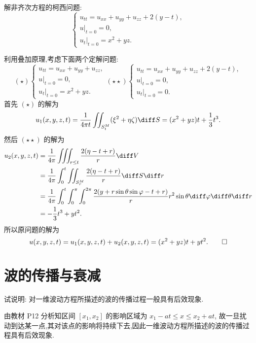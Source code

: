 \begin{exercise}[8]
  解非齐次方程的柯西问题:
  \[\begin{cases}
    u_{tt} = u_{xx}+u_{yy}+u_{zz}+2(y-t), \\
    u|_{t=0} = 0, \\
    u_t|_{t=0} = x^2+yz.
  \end{cases}\]
\end{exercise}

\begin{solve}
  利用叠加原理,考虑下面两个定解问题:
  \[(\star)
  \begin{cases}
    u_{tt}=u_{xx}+u_{yy}+u_{zz}, \\
    u|_{t=0}=0, \\
    u_t|_{t=0}=x^2+yz.
  \end{cases}
  (\star\star)
  \begin{cases}
    u_{tt} = u_{xx}+u_{yy}+u_{zz}+2(y-t), \\
    u|_{t=0}=0, \\
    u_t|_{t=0}=0.
  \end{cases}\]
  首先 $(\star)$ 的解为
  \[u_1(x,y,z,t) = \frac{1}{4\pi t}\iint_{S_t^M}(\xi^2+\eta\zeta)\diff S
    = (x^2+yz)t+\frac{1}{3}t^3.\]
  然后 $(\star\star)$ 的解为
  \[\begin{split}
    u_2(x,y,z,t)
    & = \frac{1}{4\pi}\iiint_{r\leq t}\frac{2(\eta-t+r)}{r}\diff V \\
    & = \frac{1}{4\pi}\int_0^t\iint_{S_r^M}\frac{2(\eta-t+r)}{r}\diff S\diff r \\
    & = \frac{1}{4\pi}\int_0^t\int_0^{\pi}\int_0^{2\pi}
      \frac{2(y+r\sin\theta\sin\varphi-t+r)}{r}r^2\sin\theta\diff\varphi\diff\theta\diff r \\
    & = -\frac{1}{3}t^3+yt^2.
  \end{split}\]
  所以原问题的解为
  \[u(x,y,z,t) = u_1(x,y,z,t)+u_2(x,y,z,t)=(x^2+yz)t+yt^2.\qedhere\]
\end{solve}


\section{波的传播与衰减}

\begin{exercise}
  试说明: 对一维波动方程所描述的波的传播过程一般具有后效现象.
\end{exercise}

\begin{solve}
  由教材 P12 分析知区间 $[x_1,x_2]$ 的影响区域为 $x_1-at\leq x\leq x_2+at$,
  故一旦扰动到达某一点,其对该点的影响将持续下去,因此一维波动方程所描述的波的传播过程具有后效现象.
\end{solve}


